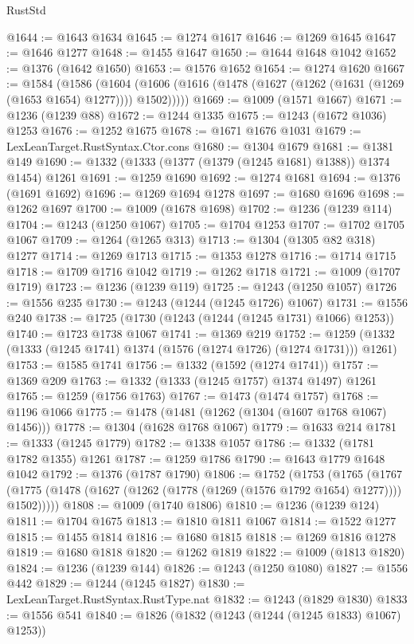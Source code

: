 \begin{lexlean}{RustStd}
\begin{coremodule}
@1644 := @1643 @1634
@1645 := @1274 @1617
@1646 := @1269 @1645
@1647 := @1646 @1277
@1648 := @1455 @1647
@1650 := @1644 @1648 @1042
@1652 := @1376 (@1642 @1650)
@1653 := @1576 @1652
@1654 := @1274 @1620
@1667 := @1584
    (@1586
      (@1604 (@1606 (@1616 (@1478 (@1627 (@1262 (@1631 (@1269 (@1653 @1654) @1277)))) @1502)))))
@1669 := @1009 (@1571 @1667)
@1671 := @1236 (@1239 @88)
@1672 := @1244 @1335
@1675 := @1243 (@1672 @1036) @1253
@1676 := @1252 @1675
@1678 := @1671 @1676 @1031
@1679 := LexLeanTarget.RustSyntax.Ctor.cons
@1680 := @1304 @1679
@1681 := @1381 @149
@1690 := @1332 (@1333 (@1377 (@1379 (@1245 @1681) @1388)) @1374 @1454) @1261
@1691 := @1259 @1690
@1692 := @1274 @1681
@1694 := @1376 (@1691 @1692)
@1696 := @1269 @1694 @1278
@1697 := @1680 @1696
@1698 := @1262 @1697
@1700 := @1009 (@1678 @1698)
@1702 := @1236 (@1239 @114)
@1704 := @1243 (@1250 @1067)
@1705 := @1704 @1253
@1707 := @1702 @1705 @1067
@1709 := @1264 (@1265 @313)
@1713 := @1304 (@1305 @82 @318) @1277
@1714 := @1269 @1713
@1715 := @1353 @1278
@1716 := @1714 @1715
@1718 := @1709 @1716 @1042
@1719 := @1262 @1718
@1721 := @1009 (@1707 @1719)
@1723 := @1236 (@1239 @119)
@1725 := @1243 (@1250 @1057)
@1726 := @1556 @235
@1730 := @1243 (@1244 (@1245 @1726) @1067)
@1731 := @1556 @240
@1738 := @1725 (@1730 (@1243 (@1244 (@1245 @1731) @1066) @1253))
@1740 := @1723 @1738 @1067
@1741 := @1369 @219
@1752 := @1259 (@1332 (@1333 (@1245 @1741) @1374 (@1576 (@1274 @1726) (@1274 @1731))) @1261)
@1753 := @1585 @1741
@1756 := @1332 (@1592 (@1274 @1741))
@1757 := @1369 @209
@1763 := @1332 (@1333 (@1245 @1757) @1374 @1497) @1261
@1765 := @1259 (@1756 @1763)
@1767 := @1473 (@1474 @1757)
@1768 := @1196 @1066
@1775 := @1478 (@1481 (@1262 (@1304 (@1607 @1768 @1067) @1456)))
@1778 := @1304 (@1628 @1768 @1067)
@1779 := @1633 @214
@1781 := @1333 (@1245 @1779)
@1782 := @1338 @1057
@1786 := @1332 (@1781 @1782 @1355) @1261
@1787 := @1259 @1786
@1790 := @1643 @1779 @1648 @1042
@1792 := @1376 (@1787 @1790)
@1806 := @1752
    (@1753
      (@1765
        (@1767 (@1775 (@1478 (@1627 (@1262 (@1778 (@1269 (@1576 @1792 @1654) @1277)))) @1502)))))
@1808 := @1009 (@1740 @1806)
@1810 := @1236 (@1239 @124)
@1811 := @1704 @1675
@1813 := @1810 @1811 @1067
@1814 := @1522 @1277
@1815 := @1455 @1814
@1816 := @1680 @1815
@1818 := @1269 @1816 @1278
@1819 := @1680 @1818
@1820 := @1262 @1819
@1822 := @1009 (@1813 @1820)
@1824 := @1236 (@1239 @144)
@1826 := @1243 (@1250 @1080)
@1827 := @1556 @442
@1829 := @1244 (@1245 @1827)
@1830 := LexLeanTarget.RustSyntax.RustType.nat
@1832 := @1243 (@1829 @1830)
@1833 := @1556 @541
@1840 := @1826 (@1832 (@1243 (@1244 (@1245 @1833) @1067) @1253))

\end{coremodule}
\end{lexlean}
